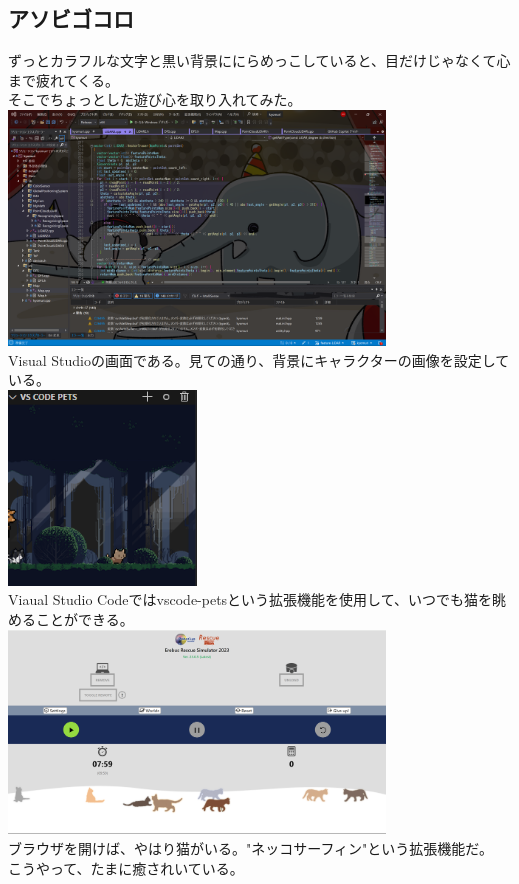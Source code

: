 \documentclass[uplatex,dvipdfmx,a4paper]{jsarticle}
\begin{document}
    \subsection{アソビゴコロ}
    ずっとカラフルな文字と黒い背景ににらめっこしていると、目だけじゃなくて心まで疲れてくる。\\
    そこでちょっとした遊び心を取り入れてみた。\\
    \includegraphics[width=100mm]{Photo/photo0.png}\\
    Visual Studioの画面である。見ての通り、背景にキャラクターの画像を設定している。\\

    \includegraphics[width=50mm]{Photo/photo2.png}\\
    Viaual Studio Codeではvscode-petsという拡張機能を使用して、いつでも猫を眺めることができる。\\

    \includegraphics[width=100mm]{Photo/photo3.png}\\
    ブラウザを開けば、やはり猫がいる。"ネッコサーフィン"という拡張機能だ。\\

    こうやって、たまに癒されいている。\\
\end{document}
